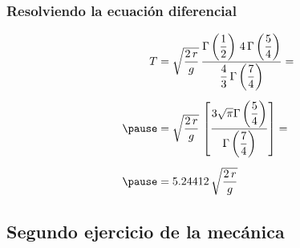 \documentclass[12pt]{beamer}
\begin{document}
\begin{frame}
\frametitle{Resolviendo la ecuación diferencial}
\begin{eqnarray*}
\begin{aligned}
T &= \sqrt{\dfrac{2 \, r}{g}} \, \dfrac{\Gamma \left(\dfrac{1}{2} \right) \, 4 \, \Gamma \left(\dfrac{5}{4} \right)}{\dfrac{4}{3} \, \Gamma \left(\dfrac{7}{4} \right)} = \\[0.5em] \pause
&= \sqrt{\dfrac{2 \, r}{g}} \, \left[ \dfrac{3 \sqrt{\pi } \Gamma \left(\dfrac{5}{4}\right)}{\Gamma \left(\dfrac{7}{4}\right)} \right] = \\[0.5em] \pause
&= 5.24412 \, \sqrt{\dfrac{2 \, r}{g}}
\end{aligned}
\end{eqnarray*}
\end{frame}

\subsection{Segundo ejercicio de la mecánica}
\end{document}
